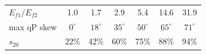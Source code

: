 \begin{tabular}{@{}lcccccc@{}}
\toprule
$E_{f1}/E_{f2}$ & 1.0 & 1.7 & 2.9 & 5.4 & 14.6 & 31.9\\
max qP skew & $0^\circ$ & $18^\circ$ & $35^\circ$ & $50^\circ$ & $65^\circ$ & $71^\circ$\\
$s_{20}$ & 22\% & 42\% & 60\% & 75\% & 88\% & 94\%\\
\bottomrule
\end{tabular}
